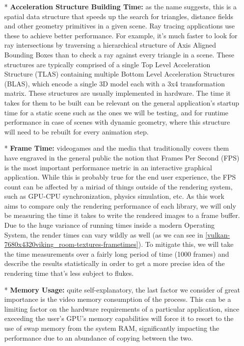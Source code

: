 \begin{itemize}
    \item[*]\textbf{Acceleration Structure Building Time:} as the name suggests, this is a spatial data structure that speeds up the search for triangles, distance fields and other geometry primitives in a given scene. Ray tracing applications use these to achieve better performance. For example, it's much faster to look for ray intersections by traversing a hierarchical structure of Axis Aligned Bounding Boxes than to check a ray against every triangle in a scene. These structures are typically comprised of a single Top Level Acceleration Structure (TLAS) containing multiple Bottom Level Acceleration Structures (BLAS), which encode a single 3D model each with a 3x4 transformation matrix. These structures are usually implemented in hardware. The time it takes for them to be built can be relevant on the general application's startup time for a static scene such as the ones we will be testing, and for runtime performance in case of scenes with dynamic geometry, where this structure will need to be rebuilt for every animation step.
    \item[*]\textbf{Frame Time:} videogames and the media that traditionally covers them have engraved in the general public the notion that Frames Per Second (FPS) is the most important performance metric in an interactive graphical application. While this is probably true for the end user experience, the FPS count can be affected by a miriad of things outside of the rendering system, such as GPU-CPU synchronization, physics simulation, etc. As this work aims to compare only the rendering performance of each library, we will only be measuring the time it takes to write the rendered images to a frame buffer. Due to the huge variance of running times inside a modern Operating System, the render times can vary wildly as well (as we can see in \ref{vulkan-7680x4320viking_room-textures-frametimes}). To mitigate this, we will take the time measurements over a fairly long period of time (1000 frames) and describe the results statistically in order to get a more precise idea of the rendering time that's less subject to flukes.
    \item[*]\textbf{Memory Usage:} quite self-explanatory, the last factor we consider of great importance is the video memory consumption of the process. This can be a limiting factor on the hardware requirements of a particular application, since execeding the user's GPU's memory capabilities will force it to resort to the use of swap memory from the system RAM, significantly impacting the performance due to an abundance of copying between the two.
\end{itemize}

